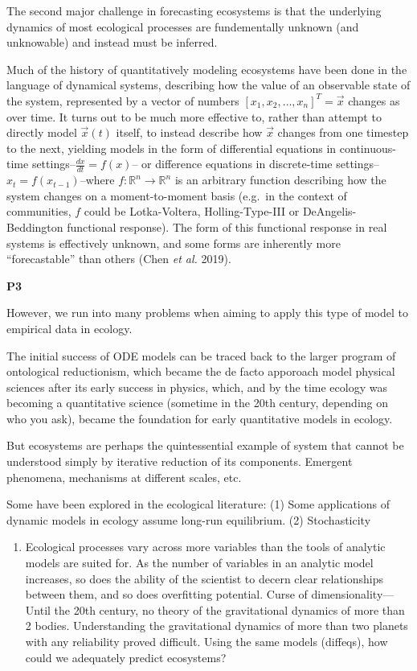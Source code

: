 \documentclass[10pt,oneside]{article}
\begin{document}
The second major challenge in forecasting ecosystems is that the
underlying dynamics of most ecological processes are fundementally
unknown (and unknowable) and instead must be inferred.

Much of the history of quantitatively modeling ecosystems have been done
in the language of dynamical systems, describing how the value of an
observable state of the system, represented by a vector of numbers
\([x_1, x_2, \dots, x_n]^T = \vec{x}\) changes as over time. It turns
out to be much more effective to, rather than attempt to directly model
\(\vec{x}(t)\) itself, to instead describe how \(\vec{x}\) changes from
one timestep to the next, yielding models in the form of differential
equations in continuous-time settings--\(\frac{dx}{dt} = f(x)\)-- or
difference equations in discrete-time
settings--\(x_t = f(x_{t-1})\)--where
\(f:\mathbb{R}^n \to \mathbb{R}^n\) is an arbitrary function describing
how the system changes on a moment-to-moment basis (e.g.~in the context
of communities, \(f\) could be Lotka-Voltera, Holling-Type-III or
DeAngelis-Beddington functional response). The form of this functional
response in real systems is effectively unknown, and some forms are
inherently more ``forecastable'' than others (Chen \emph{et al.} 2019).

\textbf{P3}

However, we run into many problems when aiming to apply this type of
model to empirical data in ecology.

The initial success of ODE models can be traced back to the larger
program of ontological reductionism, which became the de facto apporoach
model physical sciences after its early success in physics, which, and
by the time ecology was becoming a quantitative science (sometime in the
20th century, depending on who you ask), became the foundation for early
quantitative models in ecology.

But ecosystems are perhaps the quintessential example of system that
cannot be understood simply by iterative reduction of its components.
Emergent phenomena, mechanisms at different scales, etc.

Some have been explored in the ecological literature: (1) Some
applications of dynamic models in ecology assume long-run equilibrium.
(2) Stochasticity

\begin{enumerate}
\def\labelenumi{(\arabic{enumi})}
\setcounter{enumi}{2}
\tightlist
\item
  Ecological processes vary across more variables than the tools of
  analytic models are suited for. As the number of variables in an
  analytic model increases, so does the ability of the scientist to
  decern clear relationships between them, and so does overfitting
  potential. Curse of dimensionality--- Until the 20th century, no
  theory of the gravitational dynamics of more than 2 bodies.
  Understanding the gravitational dynamics of more than two planets with
  any reliability proved difficult. Using the same models (diffeqs), how
  could we adequately predict ecosystems?
\end{enumerate}
\end{document}
